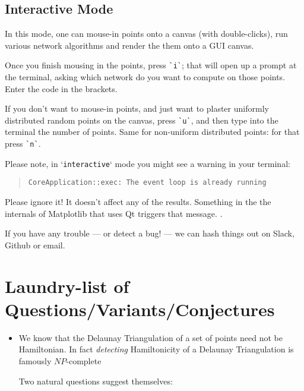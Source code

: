 \begin{appendices}
\subsection{Interactive Mode}

In this mode, one can mouse-in points onto a canvas (with double-clicks), run various network algorithms 
and render the them onto a GUI canvas. 

Once you finish mousing in the points, press \verb|`i`|; that will open up a prompt at the terminal, asking which 
network do you want to compute on those points. Enter the code in the brackets. 

If you don't want to mouse-in points, and just want to plaster uniformly distributed random points on the canvas, 
press \verb|`u`|, and then type into the terminal the number of points. Same for non-uniform distributed points: for that
press \verb|`n`|. 

Please note, in `\verb|interactive|` mode you might see a
warning in your terminal:

\begin{quote}
\color{blue}
\verb|CoreApplication::exec: The event loop is already running|
\end{quote}

Please ignore it! It doesn't affect any of the results. Something in the
the internals of Matplotlib that uses Qt triggers that message. \shrug. 

If you have any trouble --- or detect a bug! ---  we can hash things out on Slack, Github or email.

\section{Laundry-list of Questions/Variants/Conjectures}
 \label{sec:questions}

\begin{itemize}
\item We know that the Delaunay Triangulation of a set of points need not be Hamiltonian. In fact \textit{detecting}
      Hamiltonicity of a Delaunay Triangulation is famously $NP$-complete \cite{dillencourt1996finding} 

      Two natural questions suggest themselves:


\end{itemize}
\end{appendices}
